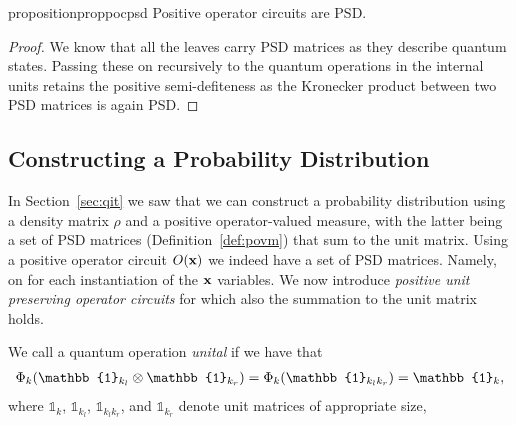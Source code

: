 


\begin{restatable}{proposition}{proppocpsd}
	\label{prop:pocpsd}
	Positive operator circuits are PSD.
\end{restatable}


\begin{proof}
	We know that all the leaves carry PSD matrices as they describe quantum states. Passing these on recursively to the quantum operations in the internal units retains the positive semi-defiteness as the Kronecker product between two PSD matrices is again PSD.
\end{proof}






\subsection{Constructing a Probability Distribution}


In Section~\ref{sec:qit} we saw that we can construct a probability distribution using a density matrix $\rho$ and a positive operator-valued measure, with the latter being a set of PSD matrices (\cf Definition~\ref{def:povm}) that sum to the unit matrix. Using a positive operator circuit $O(\mathbf{x})$ we indeed have a set of PSD matrices. Namely, on for each instantiation of the $\mathbf{x}$ variables. We now introduce \textit{positive unit preserving operator circuits} for which also the summation to the unit matrix holds.

\begin{definition}
	\label{def:cp_unital}
	We call a quantum operation \textit{unital} if we have that
	\begin{align}
		\qop_k(\mathbb{1}_{k_l} \otimes \mathbb{1}_{k_r})
		=\qop_k(\mathbb{1}_{k_l k_r})
		=  \mathbb{1}_k,
	\end{align}
	where $\mathbb{1}_{k}$, $\mathbb{1}_{k_l}$, $\mathbb{1}_{k_l k_r}$, and $\mathbb{1}_{k_r}$  denote unit matrices of appropriate size,
\end{definition}


